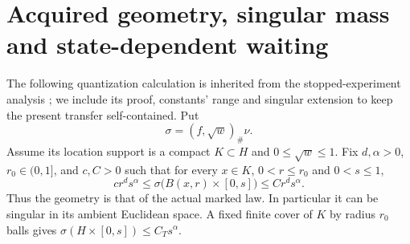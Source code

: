 \section{Acquired geometry, singular mass and state-dependent waiting}
\label{sec:geometry}
The following quantization calculation is inherited from the stopped-experiment analysis \cite{GTF52,GTF53}; we include its proof, constants' range and singular extension to keep the present transfer self-contained. Put
\[
 \sigma=(f,\sqrt w)_\#\nu.
\]
Assume its location support is a compact $K\subset H$ and $0\le\sqrt w\le1$. Fix $d,\alpha>0$, $r_0\in(0,1]$, and $c,C>0$ such that for every $x\in K$, $0<r\le r_0$ and $0<s\le1$,
\begin{equation}\label{eq:rectangle}
 cr^d s^\alpha\le\sigma\bigl(B(x,r)\times[0,s]\bigr)
                  \le Cr^d s^\alpha.
\end{equation}
Thus the geometry is that of the actual marked law. In particular it can be singular in its ambient Euclidean space. A fixed finite cover of $K$ by radius $r_0$ balls gives $\sigma(H\times[0,s])\le C_Ts^\alpha$.


